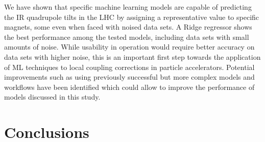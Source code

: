 We have shown that specific machine learning models are capable of predicting the IR quadrupole tilts in the LHC by assigning a representative value to specific magnets, some even when faced with noised data sets.
A Ridge regressor shows the best performance among the tested models, including data sets with small amounts of noise.
While usability in operation would require better accuracy on data sets with higher noise, this is an important first step towards the application of ML techniques to local coupling corrections in particle accelerators.
Potential improvements such as using previously successful but more complex models and workflows have been identified which could allow to improve the performance of models discussed in this study.

\section{Conclusions}
